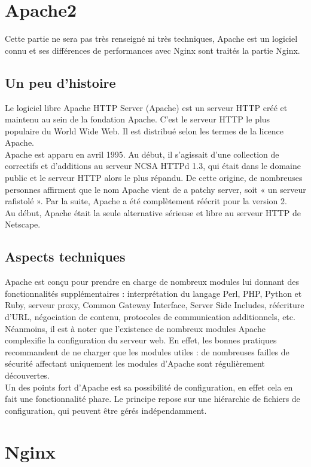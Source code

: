 \documentclass[a4paper,10pt,one side,titlepage]{report}
\begin{document}
\chapter{Apache2}
Cette partie ne sera pas très renseigné ni très techniques, Apache est un logiciel connu
et ses différences de performances avec Nginx sont traités la partie Nginx.
\section{Un peu d'histoire}
Le logiciel libre Apache HTTP Server (Apache) est un serveur HTTP créé et maintenu au sein de la fondation Apache. C'est le serveur HTTP le plus populaire du World Wide Web. Il est distribué selon les termes de la licence Apache.\\
Apache est apparu en avril 1995. Au début, il s'agissait d'une collection de correctifs et d'additions au serveur NCSA HTTPd 1.3, qui était dans le domaine public et le serveur HTTP alors le plus répandu. De cette origine, de nombreuses personnes affirment que le nom Apache vient de a patchy server, soit « un serveur rafistolé ». Par la suite, Apache a été complètement réécrit pour la version 2.\\
Au début, Apache était la seule alternative sérieuse et libre au serveur HTTP de Netscape.\\
\section{Aspects techniques}
Apache est conçu pour prendre en charge de nombreux modules lui donnant des fonctionnalités supplémentaires : interprétation du langage Perl, PHP, Python et Ruby, serveur proxy, Common Gateway Interface, Server Side Includes, réécriture d'URL, négociation de contenu, protocoles de communication additionnels, etc. Néanmoins, il est à noter que l'existence de nombreux modules Apache complexifie la configuration du serveur web. En effet, les bonnes pratiques recommandent de ne charger que les modules utiles : de nombreuses failles de sécurité affectant uniquement les modules d'Apache sont régulièrement découvertes.\\
Un des points fort d'Apache est sa possibilité de configuration, en effet cela en fait une fonctionnalité phare. Le principe repose sur une hiérarchie de fichiers de configuration, qui peuvent être gérés indépendamment.

\chapter{Nginx}

\end{document}
